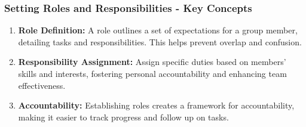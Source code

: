 \documentclass[aspectratio=169]{beamer}
\begin{document}
\begin{frame}[fragile]
    \frametitle{Setting Roles and Responsibilities - Key Concepts}
    \begin{enumerate}
        \item \textbf{Role Definition:} 
        A role outlines a set of expectations for a group member, detailing tasks and responsibilities. This helps prevent overlap and confusion.
        
        \item \textbf{Responsibility Assignment:} 
        Assign specific duties based on members' skills and interests, fostering personal accountability and enhancing team effectiveness.
        
        \item \textbf{Accountability:} 
        Establishing roles creates a framework for accountability, making it easier to track progress and follow up on tasks.
    \end{enumerate}
\end{frame}
\end{document}
